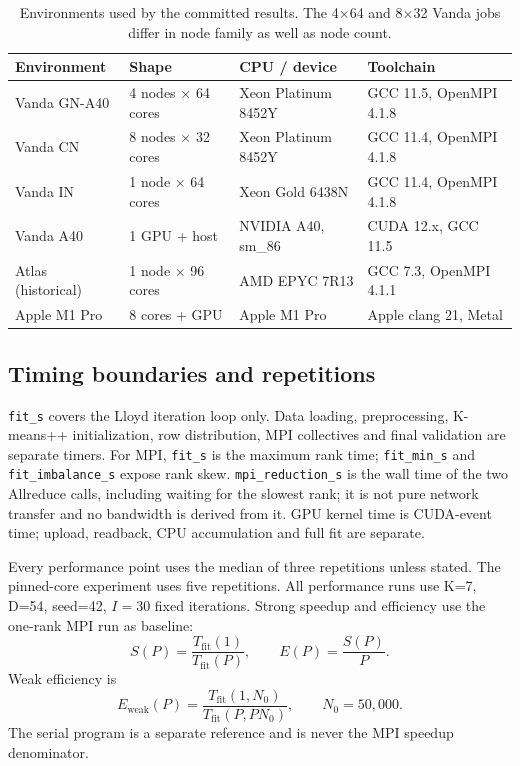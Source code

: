 \documentclass[10pt,a4paper]{article}
\newcommand{\code}[1]{\texttt{#1}}
\begin{document}
\begin{table}[H]
\centering\small
\caption{Environments used by the committed results. The 4$\times$64 and
8$\times$32 Vanda jobs differ in node family as well as node count.}
\label{tab:hardware}
\begin{tabular}{llll}
\toprule
Environment & Shape & CPU / device & Toolchain \\
\midrule
Vanda GN-A40 & 4 nodes $\times$ 64 cores & Xeon Platinum 8452Y & GCC 11.5, OpenMPI 4.1.8 \\
Vanda CN & 8 nodes $\times$ 32 cores & Xeon Platinum 8452Y & GCC 11.4, OpenMPI 4.1.8 \\
Vanda IN & 1 node $\times$ 64 cores & Xeon Gold 6438N & GCC 11.4, OpenMPI 4.1.8 \\
Vanda A40 & 1 GPU + host & NVIDIA A40, sm\_86 & CUDA 12.x, GCC 11.5 \\
Atlas (historical) & 1 node $\times$ 96 cores & AMD EPYC 7R13 & GCC 7.3, OpenMPI 4.1.1 \\
Apple M1 Pro & 8 cores + GPU & Apple M1 Pro & Apple clang 21, Metal \\
\bottomrule
\end{tabular}
\end{table}

\subsection{Timing boundaries and repetitions}
\code{fit\_s} covers the Lloyd iteration loop only. Data loading, preprocessing,
K-means++ initialization, row distribution, MPI collectives and final
validation are separate timers. For MPI, \code{fit\_s} is the maximum rank time;
\code{fit\_min\_s} and \code{fit\_imbalance\_s} expose rank skew.
\code{mpi\_reduction\_s} is the wall time of the two Allreduce calls, including
waiting for the slowest rank; it is not pure network transfer and no bandwidth
is derived from it. GPU kernel time is CUDA-event time; upload, readback, CPU
accumulation and full fit are separate.

Every performance point uses the median of three repetitions unless stated.
The pinned-core experiment uses five repetitions. All performance runs use
K=7, D=54, seed=42, $I=30$ fixed iterations. Strong speedup and efficiency use
the one-rank MPI run as baseline:
\begin{equation}
S(P)=\frac{T_{\mathrm{fit}}(1)}{T_{\mathrm{fit}}(P)},\qquad
E(P)=\frac{S(P)}{P}.
\end{equation}
Weak efficiency is
\begin{equation}
E_{\mathrm{weak}}(P)=\frac{T_{\mathrm{fit}}(1,N_0)}
{T_{\mathrm{fit}}(P,P N_0)},\qquad N_0=50{,}000.
\end{equation}
The serial program is a separate reference and is never the MPI speedup
denominator.
\end{document}
